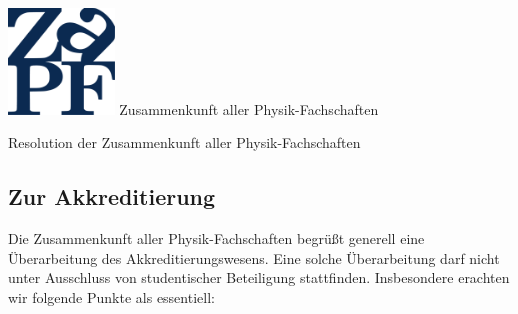 \documentclass[DIV=calc]{scrartcl}
\begin{document}
    \hspace{0.87\textwidth}
    \begin{minipage}{120pt}
        \vspace{-1.8cm}
        \includegraphics[width=80pt]{../../logo.pdf}
        \centering
        \small Zusammenkunft aller Physik-Fachschaften
    \end{minipage}
    \begin{center}
        \huge{Resolution  der Zusammenkunft aller Physik-Fachschaften}\vspace{.25\baselineskip}\\
        \normalsize
    \end{center}
    \vspace{1cm}      
%
%
\subsection*{Zur Akkreditierung}
Die Zusammenkunft aller Physik-Fachschaften begrüßt generell eine Überarbeitung des Akkreditierungswesens. Eine solche Überarbeitung darf nicht unter Ausschluss von studentischer Beteiligung stattfinden. Insbesondere erachten wir folgende Punkte als essentiell:
\end{document}
